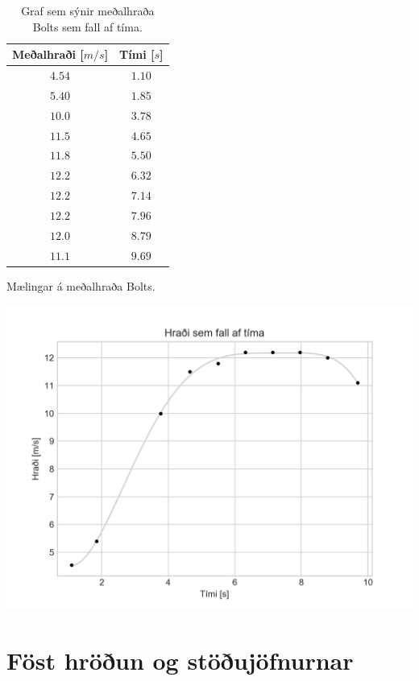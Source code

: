 \begin{table}[H]
\begin{minipage}[c]{0.38\linewidth}
\centering
\begin{tabular}{|c|c|}
\hline
\textbf{Meðalhraði} [$\si{m/s}$] & \textbf{Tími} [$\si{s}$]\\
\hline
$4.54$ & $1.10$  \\
$5.40$ & $1.85$  \\
$10.0$ & $3.78$  \\
$11.5$ & $4.65$   \\
$11.8$ & $5.50$   \\
$12.2$ & $6.32$  \\
$12.2$ & $7.14$  \\
$12.2$ & $7.96$    \\
$12.0$ & $8.79$  \\
$11.1$ & $9.69$   \\
\hline
\end{tabular}
\label{tafla:usain2}
\caption{Mælingar á meðalhraða Bolts.}
\end{minipage}\hfill
\begin{minipage}[c]{0.6\linewidth}
\centering
\includegraphics[scale = 0.6]{images/plot_2.png}
\caption{Graf sem sýnir meðalhraða Bolts sem fall af tíma.}
\label{fig:bolt2}
\end{minipage}
\end{table}

\newpage

\section{Föst hröðun og stöðujöfnurnar}

